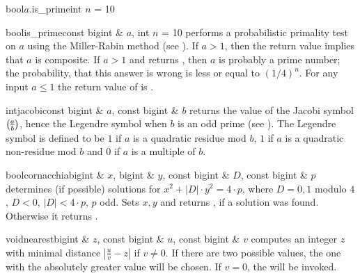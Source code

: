
\begin{cfcode}{bool}{$a$.is_prime}{int $n$ = 10}\end{cfcode}
\begin{fcode}{bool}{is_prime}{const bigint & $a$, int $n$ = 10}
  performs a probabilistic primality test on $a$ using the Miller-Rabin method (see \cite[page
  415]{Cohen:1995}).  If $a > 1$, then the return value \FALSE implies that $a$ is composite.
  If $a>1$ and  returns \TRUE, then $a$ is probably a prime number; the
  probability, that this answer is wrong is less or equal to $(1/4)^{n}$.  For any input $a \leq
  1$ the return value of  is \FALSE .
\end{fcode}

\begin{fcode}{int}{jacobi}{const bigint & $a$, const bigint & $b$}
  returns the value of the Jacobi symbol $\jacobi{a}{b}$, hence the Legendre symbol when $b$ is
  an odd prime (see \cite[page 28]{Cohen:1995}).  The Legendre symbol is defined to be $1$ if
  $a$ is a quadratic residue mod $b$, $1$ if $a$ is a quadratic non-residue mod $b$ and $0$ if
  $a$ is a multiple of $b$.
\end{fcode}

\begin{fcode}{bool}{cornacchia}{bigint & $x$, bigint & $y$, const bigint & $D$, const bigint & $p$}
  determines (if possible) solutions for $x^2 + |D| \cdot y^2 = 4 \cdot p$, where $D = 0,1$
  modulo $4$, $D < 0$, $|D| < 4 \cdot p$, $p$ odd.  Sets $x, y$ and returns \TRUE, if a solution
  was found.  Otherwise it returns \FALSE.
\end{fcode}

\begin{fcode}{void}{nearest}{bigint & $z$,  const bigint & $u$, const bigint & $v$}
  computes an integer $z$ with minimal distance $|\frac{u}{v} - z|$ if $v \neq 0$.  If there are
  two possible values, the one with the absolutely greater value will be chosen.  If $v = 0$,
  the \LEH will be invoked.
\end{fcode}

